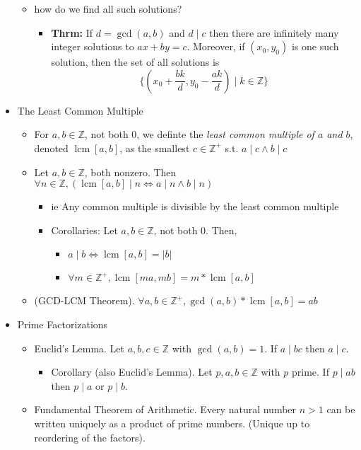 \documentclass[11pt]{article}
\theoremstyle{definition}
\newcommand{\bb}[1]{\mathbb{#1}}
\DeclareMathOperator{\lcm}{lcm}
\begin{document}
\begin{itemize}
\begin{itemize}
        \item how do we find all such solutions? 
        \begin{itemize}
            \item \textbf{Thrm:} If $d=\gcd(a,b)$ and $d\mid c$ then there are infinitely many integer solutions to $ax+by=c$. Moreover, if $(x_0,y_0)$ is one such solution, then the set of all solutions is $$\{(x_0+\frac{bk}{d},y_0-\frac{ak}{d})\mid k\in\bb{Z}\}$$
        \end{itemize}
    \end{itemize}
    \item The Least Common Multiple
    \begin{itemize}
        \item For $a,b\in\bb{Z}$, not both 0, we definte the \emph{least common multiple of $a$ and $b$}, denoted $\lcm[a,b]$, as the smallest $c\in\bb{Z}^+$ s.t. $a\mid c \land b\mid c$
        \item Let $a,b\in\bb{Z}$, both nonzero. Then $\forall n\in\bb{Z},(\lcm[a,b]\mid n \Leftrightarrow a\mid n \land b\mid n)$
        \begin{itemize}
            \item ie Any common multiple is divisible by the least common multiple
            \item Corollaries: Let $a,b\in\bb{Z}$, not both 0. Then,
            \begin{itemize}
                \item $a\mid b \Leftrightarrow \lcm[a,b] = |b|$
                \item $\forall m\in\bb{Z}^+, \lcm[ma,mb] = m*\lcm[a,b]$
            \end{itemize}
        \end{itemize}
        \item (GCD-LCM Theorem). $\forall a,b\in\bb{Z}^+,\gcd(a,b)*\lcm[a,b] = ab$
    \end{itemize}
    \item Prime Factorizations
    \begin{itemize}
        \item Euclid's Lemma. Let $a,b,c\in\bb{Z}$ with $\gcd(a,b)=1$. If $a\mid bc$ then $a\mid c$.
        \begin{itemize}
            \item Corollary (also Euclid's Lemma). Let $p,a,b\in\bb{Z}$ with $p$ prime. If $p\mid ab$ then $p\mid a$ or $p\mid b$.
        \end{itemize}
        \item Fundamental Theorem of Arithmetic. Every natural number $n>1$ can be written uniquely as a product of prime numbers. (Unique up to reordering of the factors).

\end{itemize}
\end{itemize}
\end{document}
